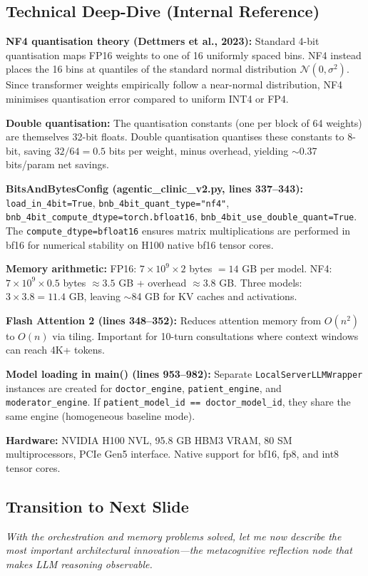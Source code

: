 \documentclass[12pt]{article}
\begin{document}
  \subsection*{Technical Deep-Dive (Internal Reference)}
  {\color{techgray}
  \textbf{NF4 quantisation theory (Dettmers et al., 2023):} Standard 4-bit quantisation maps FP16 weights to one of 16 uniformly spaced bins. NF4 instead places the 16 bins at quantiles of the standard normal distribution $\mathcal{N}(0, \sigma^2)$. Since transformer weights empirically follow a near-normal distribution, NF4 minimises quantisation error compared to uniform INT4 or FP4.

  \textbf{Double quantisation:} The quantisation constants (one per block of 64 weights) are themselves 32-bit floats. Double quantisation quantises these constants to 8-bit, saving $32/64 = 0.5$ bits per weight, minus overhead, yielding $\sim$0.37 bits/param net savings.

  \textbf{BitsAndBytesConfig (agentic\_clinic\_v2.py, lines 337--343):} \texttt{load\_in\_4bit=True}, \texttt{bnb\_4bit\_quant\_type="nf4"}, \texttt{bnb\_4bit\_compute\_dtype=torch.bfloat16}, \texttt{bnb\_4bit\_use\_double\_quant=True}. The \texttt{compute\_dtype=bfloat16} ensures matrix multiplications are performed in bf16 for numerical stability on H100 native bf16 tensor cores.

  \textbf{Memory arithmetic:} FP16: $7 \times 10^9 \times 2$ bytes $= 14$ GB per model. NF4: $7 \times 10^9 \times 0.5$ bytes $\approx 3.5$ GB + overhead $\approx 3.8$ GB. Three models: $3 \times 3.8 = 11.4$ GB, leaving $\sim$84 GB for KV caches and activations.

  \textbf{Flash Attention 2 (lines 348--352):} Reduces attention memory from $O(n^2)$ to $O(n)$ via tiling. Important for 10-turn consultations where context windows can reach 4K+ tokens.

  \textbf{Model loading in main() (lines 953--982):} Separate \texttt{LocalServerLLMWrapper} instances are created for \texttt{doctor\_engine}, \texttt{patient\_engine}, and \texttt{moderator\_engine}. If \texttt{patient\_model\_id == doctor\_model\_id}, they share the same engine (homogeneous baseline mode).

  \textbf{Hardware:} NVIDIA H100 NVL, 95.8 GB HBM3 VRAM, 80 SM multiprocessors, PCIe Gen5 interface. Native support for bf16, fp8, and int8 tensor cores.
  }

  \subsection*{Transition to Next Slide}
  {\color{transgreen}
  \textit{With the orchestration and memory problems solved, let me now describe the most important architectural innovation---the metacognitive reflection node that makes LLM reasoning observable.}
  }
\end{document}
